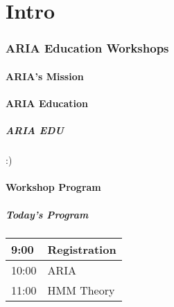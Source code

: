\part{Intro}

\section{ARIA Education Workshops}
\label{sec:aria}


\subsection{ARIA's Mission}
\label{sec:arimamis}


\subsection{ARIA Education}
\label{sec:ae}


\begin{frame}
  \frametitle{ARIA EDU} :)
\end{frame}

\subsection{Workshop Program}
\label{sec:program}
\begin{frame}
  \frametitle{Today's Program}

  \begin{table}[h]
    \centering
    \begin{tabular}{|| l | l ||}
      \hline \hline
      9:00 & Registration \\
      \hline
      10:00 & ARIA \\
      \hline \hline
      11:00 & HMM Theory \\
      \hline \hline
      
    \end{tabular}
    \label{tab:program}
  \end{table}
\end{frame}
